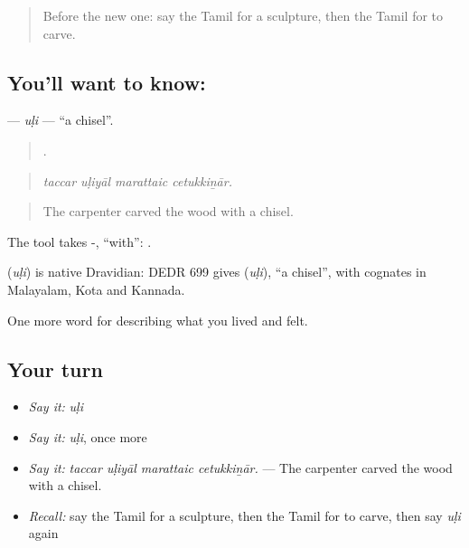 \label{lesson:TA-C537-uli}



\begin{quote}
Before the new one: say the Tamil for a sculpture, then the Tamil for to carve.
\end{quote}

\subsection*{You'll want to know: }
\textbf{} — \emph{uḷi} — \textquotedblleft{}a chisel\textquotedblright{}.

\begin{quote}
   .
\end{quote}

\begin{quote}
\emph{taccar uḷiyāl marattaic cetukkiṉār.}
\end{quote}

\begin{quote}
The carpenter carved the wood with a chisel.
\end{quote}

The tool takes -, \textquotedblleft{}with\textquotedblright{}: .

\begin{cousinweb}
\textbf{} (\emph{uḷi}) is native Dravidian: DEDR 699 gives  (\emph{uḷi}), \textquotedblleft{}a chisel\textquotedblright{}, with cognates in Malayalam, Kota and Kannada.
\end{cousinweb}

\begin{grammarlens}[title={What you've built}]
One more word for describing what you lived and felt.
\end{grammarlens}

\subsection*{Your turn}
\begin{itemize}
\raggedright
  \item \emph{Say it:} \emph{uḷi}
  \item \emph{Say it:} \emph{uḷi}, once more
  \item \emph{Say it:} \emph{taccar uḷiyāl marattaic cetukkiṉār.} — The carpenter carved the wood with a chisel.
  \item \emph{Recall:} say the Tamil for a sculpture, then the Tamil for to carve, then say \emph{uḷi} again
\end{itemize}

